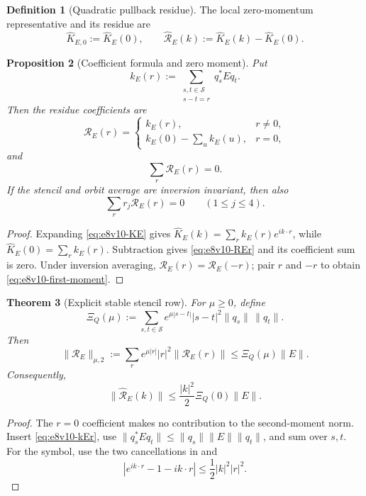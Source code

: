 \documentclass[11pt,oneside]{book}
\newtheorem{theorem}{Theorem}[chapter]
\newtheorem{proposition}[theorem]{Proposition}
\theoremstyle{definition}
\newtheorem{definition}[theorem]{Definition}
\theoremstyle{remark}
\begin{document}
\begin{definition}[Quadratic pullback residue]
\label{def:e8v10-residue}
The local zero-momentum representative and its residue are
\[
 \widehat K_{E,0}:=\widehat K_E(0),\qquad
 \widehat{\mathscr R}_E(k):=
 \widehat K_E(k)-\widehat K_E(0).                   \label{eq:e8v10-RE}
\]
\end{definition}

\begin{proposition}[Coefficient formula and zero moment]
\label{prop:e8v10-coefficients}
Put
\[
 k_E(r):=\sum_{\substack{s,t\in{\mathcal S}\\s-t=r}}
 q_s^*Eq_t.                                         \label{eq:e8v10-kEr}
\]
Then the residue coefficients are
\[
 {\mathscr R}_E(r)=
 \begin{cases}
 k_E(r),&r\ne0,\\
 k_E(0)-\sum_u k_E(u),&r=0,
 \end{cases}                                        \label{eq:e8v10-REr}
\]
and
\[
 \sum_r{\mathscr R}_E(r)=0.                         \label{eq:e8v10-zero-moment}
\]
If the stencil and orbit average are inversion invariant, then also
\[
 \sum_r r_j{\mathscr R}_E(r)=0\qquad(1\le j\le4).    \label{eq:e8v10-first-moment}
\]
\end{proposition}

\begin{proof}
Expanding \eqref{eq:e8v10-KE} gives
\(\widehat K_E(k)=\sum_rk_E(r)e^{ik\cdot r}\), while
\(\widehat K_E(0)=\sum_rk_E(r)\).  Subtraction gives
\eqref{eq:e8v10-REr} and its coefficient sum is zero.  Under inversion
averaging, \({\mathscr R}_E(r)={\mathscr R}_E(-r)\); pair \(r\) and
\(-r\) to obtain \eqref{eq:e8v10-first-moment}.
\end{proof}

\begin{theorem}[Explicit stable stencil row]
\label{thm:e8v10-stencil-row}
For \(\mu\ge0\), define
\[
 \Xi_Q(\mu):=
 \sum_{s,t\in{\mathcal S}}
 e^{\mu|s-t|}|s-t|^2\|q_s\|\,\|q_t\|.              \label{eq:e8v10-Xi}
\]
Then
\[
 \|{\mathscr R}_E\|_{\mu,2}
 :=\sum_r e^{\mu|r|}|r|^2\|{\mathscr R}_E(r)\|
 \le\Xi_Q(\mu)\|E\|.                                \label{eq:e8v10-stencil-bound}
\]
Consequently,
\[
 \|\widehat{\mathscr R}_E(k)\|
 \le\frac{|k|^2}{2}\Xi_Q(0)\|E\|.                  \label{eq:e8v10-symbol-bound}
\]
\end{theorem}

\begin{proof}
The \(r=0\) coefficient makes no contribution to the second-moment
norm.  Insert \eqref{eq:e8v10-kEr}, use
\(\|q_s^*Eq_t\|\le\|q_s\|\|E\|\|q_t\|\), and sum over \(s,t\).
For the symbol, use the two cancellations in
 and
\[
 |e^{ik\cdot r}-1-ik\cdot r|
 \le\frac12|k|^2|r|^2.
\]
\end{proof}
\end{document}
